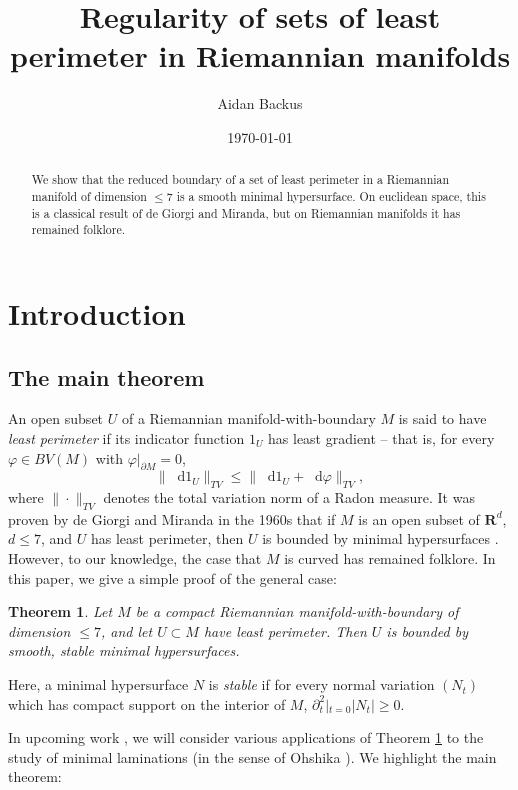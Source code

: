 \documentclass[reqno,11pt]{amsart}
\title{Regularity of sets of least perimeter in Riemannian manifolds}
\author{Aidan Backus}
\date{\today}
\newcommand{\RR}{\mathbf{R}}
\newcommand*\dif{\mathop{}\!\mathrm{d}}
\newcommand{\dfn}[1]{\emph{#1}\index{#1}}
\newtheorem{theorem}{Theorem}[section]
\theoremstyle{definition}
\numberwithin{equation}{section}
\begin{document}
\begin{abstract}
    We show that the reduced boundary of a set of least perimeter in a Riemannian manifold of dimension $\leq 7$ is a smooth minimal hypersurface.
    On euclidean space, this is a classical result of de Giorgi and Miranda, but on Riemannian manifolds it has remained folklore.
\end{abstract}

\maketitle

\section{Introduction}
\subsection{The main theorem}
An open subset $U$ of a Riemannian manifold-with-boundary $M$ is said to have \dfn{least perimeter} if its indicator function $1_U$ has least gradient -- that is, for every $\varphi \in BV(M)$ with $\varphi|_{\partial M} = 0$, 
\begin{equation}\label{least perimeter dfn}
\|\dif 1_U\|_{TV} \leq \|\dif 1_U + \dif \varphi\|_{TV},
\end{equation}
where $\|\cdot\|_{TV}$ denotes the total variation norm of a Radon measure.
It was proven by de Giorgi and Miranda in the 1960s that if $M$ is an open subset of $\RR^d$, $d \leq 7$, and $U$ has least perimeter, then $U$ is bounded by minimal hypersurfaces \cite{deGiorgi61, Miranda66}.
However, to our knowledge, the case that $M$ is curved has remained folklore.
In this paper, we give a simple proof of the general case:

\begin{theorem}\label{main thm}
Let $M$ be a compact Riemannian manifold-with-boundary of dimension $\leq 7$, and let $U \subset M$ have least perimeter.
Then $U$ is bounded by smooth, stable minimal hypersurfaces.
\end{theorem}

Here, a minimal hypersurface $N$ is \dfn{stable} if for every normal variation $(N_t)$ which has compact support on the interior of $M$, $\partial_t^2|_{t = 0} |N_t| \geq 0$.

In upcoming work \cite{BackusCML,BackusInfinityMaxwell1}, we will consider various applications of Theorem \ref{main thm} to the study of minimal laminations (in the sense of Ohshika \cite{Ohshika90}).
We highlight the main theorem:
\end{document}

